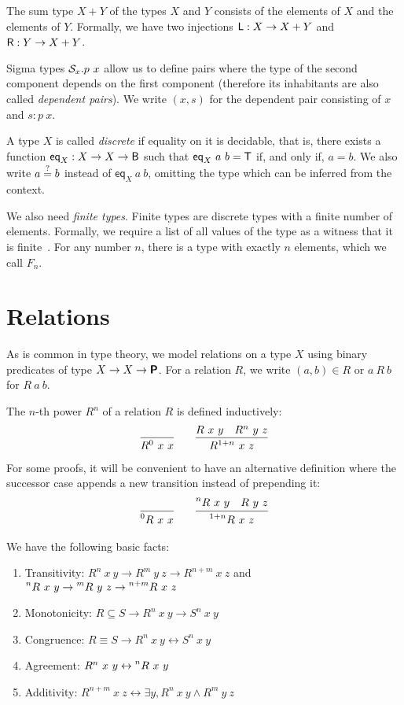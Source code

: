 The sum type $X + Y$ of the types $X$ and $Y$ consists of the elements of $X$ and the elements of $Y$. Formally, we have two injections $\textsf{L} : X \rightarrow X + Y$ and $\textsf{R} : Y \rightarrow X + Y$. 

Sigma types $\mathcal{S}_{x}.p~x$ allow us to define pairs where the type of the second component depends on the first component (therefore its inhabitants are also called \emph{dependent pairs}). We write $(x, s)$ for the dependent pair consisting of $x$ and $s : p~x$. 

A type $X$ is called \emph{discrete} if equality on it is decidable, that is, there exists a function $\textsf{eq}_X : X \rightarrow X \rightarrow \textsf{B}$ such that $\textsf{eq}_X~a~b = \mathsf{T}$ if, and only if, $a = b$. We also write $a\overset{?}{=}b$ instead of $\textsf{eq}_X~a~b$, omitting the type which can be inferred from the context. 

We also need \emph{finite types}. Finite types are discrete types with a finite number of elements. Formally, we require a list of all values of the type as a witness that it is finite~\cite{menz2016}.
For any number $n$, there is a type with exactly $n$ elements, which we call $F_n$. 

\section{Relations}
As is common in type theory, we model relations on a type $X$ using binary predicates of type $X \rightarrow X \rightarrow \textsf{\bfseries P}$. 
For a relation $R$, we write $(a, b) \in R$ or $a~R~b$ for $R~a~b$. 

The $n$-th power $R^n$ of a relation $R$ is defined inductively:
\begin{align*}
  \infer{R^0~x~x}{}
  \qquad
  \infer{R^{\natS{n}}~x~z}{R~x~y\quad R^n~y~z}
\end{align*}
For some proofs, it will be convenient to have an alternative definition where the successor case appends a new transition instead of prepending it:
\begin{align*}
  \infer{\prescript{0}{}R~x~x}{}
  \qquad
  \infer{\prescript{\natS{n}}{}R~x~z}{\prescript{n}{}R~x~y\quad R~y~z}
\end{align*}

\begin{proposition}\label{prop:relpower}
  We have the following basic facts:
  \begin{enumerate}
    \item Transitivity: $R^n~x~y \rightarrow R^m~y~z \rightarrow R^{n+m}~x~z$ and $\prescript{n}{}R~x~y \rightarrow \prescript{m}{}R~y~z \rightarrow \prescript{n+m}{}R~x~z$
    \item Monotonicity: $R \subseteq S \rightarrow R^n~x~y \rightarrow S^n~x~y$
    \item Congruence: $R \equiv S \rightarrow R^n~x~y \leftrightarrow S^n~x~y$
    \item Agreement: $R^n~x~y \leftrightarrow \prescript{n}{}R~x~y$
    \item Additivity: $R^{n+m}~x~z \leftrightarrow \exists y, R^n~x~y \land R^m~y~z$
  \end{enumerate}
\end{proposition}

